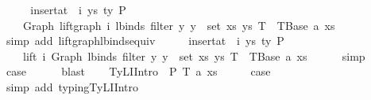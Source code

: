 \begin{isabellebody}
\ \ \isamarkupfalse%
\ \isamarkupfalse%
\ {\isachardoublequoteopen}insert{\isacharunderscore}{\kern0pt}at\ {\isasymGamma}\ i\ {\isacharparenleft}{\kern0pt}ys{\isacharcomma}{\kern0pt}\ ty{}{\isacharparenright}{\kern0pt}\ {\isasymturnstile}{\isacharbraceleft}{\kern0pt}P{\isacharbraceright}{\kern0pt}\isanewline
\ \ \ \ Graph\ {\isacharparenleft}{\kern0pt}lift{\isacharunderscore}{\kern0pt}graph\ i\ {\isacharparenleft}{\kern0pt}lbinds\ {\isacharparenleft}{\kern0pt}filter\ {\isacharparenleft}{\kern0pt}{\isasymlambda}y{\isachardot}{\kern0pt}\ y\ {\isasymnotin}\ set\ xs{\isacharparenright}{\kern0pt}\ ys{\isacharprime}{\kern0pt}{\isacharparenright}{\kern0pt}\ T{\isacharparenright}{\kern0pt}{\isacharparenright}{\kern0pt}\ {\isacharcolon}{\kern0pt}\ TBase\ a\ xs{\isachardoublequoteclose}\isanewline
\ \ \ \ \isamarkupfalse%
\ {\isacharparenleft}{\kern0pt}simp\ add{\isacharcolon}{\kern0pt}\ lift{\isacharunderscore}{\kern0pt}graph{\isacharunderscore}{\kern0pt}lbinds{\isacharunderscore}{\kern0pt}equiv{\isacharparenright}{\kern0pt}\isanewline
\ \ \isamarkupfalse%
\ \isamarkupfalse%
\ {\isachardoublequoteopen}insert{\isacharunderscore}{\kern0pt}at\ {\isasymGamma}\ i\ {\isacharparenleft}{\kern0pt}ys{\isacharcomma}{\kern0pt}\ ty{}{\isacharparenright}{\kern0pt}\ {\isasymturnstile}{\isacharbraceleft}{\kern0pt}P{\isacharbraceright}{\kern0pt}\isanewline
\ \ \ \ lift\ i\ {\isacharparenleft}{\kern0pt}Graph\ {\isacharparenleft}{\kern0pt}lbinds\ {\isacharparenleft}{\kern0pt}filter\ {\isacharparenleft}{\kern0pt}{\isasymlambda}y{\isachardot}{\kern0pt}\ y\ {\isasymnotin}\ set\ xs{\isacharparenright}{\kern0pt}\ ys{\isacharprime}{\kern0pt}{\isacharparenright}{\kern0pt}\ T{\isacharparenright}{\kern0pt}{\isacharparenright}{\kern0pt}\ {\isacharcolon}{\kern0pt}\ TBase\ a\ xs{\isachardoublequoteclose}\isanewline
\ \ \ \ \isamarkupfalse%
\ simp\isanewline
\ \ \isamarkupfalse%
\ \isamarkupfalse%
\ {\isacharquery}{\kern0pt}case\isanewline
\ \ \ \ \isamarkupfalse%
\ blast\isanewline
{}\isamarkupfalse%
\isanewline
\ \ \isamarkupfalse%
\ {\isacharparenleft}{\kern0pt}TyLIIntro{}\ {\isasymGamma}\ P\ T\ a\ xs{\isacharparenright}{\kern0pt}\isanewline
\ \ \isamarkupfalse%
\ \isamarkupfalse%
\ {\isacharquery}{\kern0pt}case\isanewline
\ \ \isamarkupfalse%
\ {\isacharparenleft}{\kern0pt}simp\ add{\isacharcolon}{\kern0pt}\ typing{\isachardot}{\kern0pt}TyLIIntro{}{\isacharparenright}{\kern0pt}\isanewline

\end{isabellebody}

